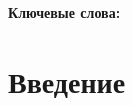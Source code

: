 \begin{abstract}
\end{abstract}

\begin{center}
\textbf{Ключевые слова:}
\end{center}

\section{Введение}
